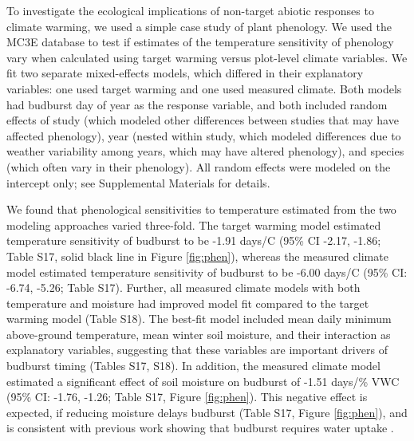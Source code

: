 \documentclass{article}
\begin{document}
\par To investigate the ecological implications of non-target abiotic responses to climate warming, we used a simple case study of plant phenology. We used the MC3E database to test if estimates of the temperature sensitivity of phenology vary when calculated using target warming versus plot-level climate variables. We fit two separate mixed-effects models, which differed in their explanatory variables: one used target warming and one used measured climate. Both models had budburst day of year as the response variable, and both included random effects of study (which modeled other differences between studies that may have affected phenology), year (nested within study, which modeled differences due to weather variability among years, which may have altered phenology), and species (which often vary in their phenology). All random effects were modeled on the intercept only; see Supplemental Materials for details.

\par We found that phenological sensitivities to temperature estimated from the two modeling approaches varied three-fold. The target warming model estimated temperature sensitivity of budburst to be -1.91 days/\degree C (95\% CI -2.17, -1.86; Table S17, solid black line in Figure \ref{fig:phen}), whereas the measured climate model estimated temperature sensitivity of budburst to be -6.00 days/\degree C (95\% CI: -6.74, -5.26; Table S17). Further, all measured climate models with both temperature and moisture had improved model fit compared to the target warming model (Table S18). The best-fit model included mean daily minimum above-ground temperature, mean winter soil moisture, and their interaction as explanatory variables, suggesting that these variables are important drivers of budburst timing (Tables S17, S18). 
In addition, the measured climate model estimated a significant effect of soil moisture on budburst of -1.51 days/\% VWC (95\% CI: -1.76, -1.26; Table S17, Figure \ref{fig:phen}). This negative effect is expected, if reducing moisture delays budburst (Table S17, Figure \ref{fig:phen}), and is consistent with previous work showing that budburst requires water uptake \citep{essiamah1986}. 
\end{document}

